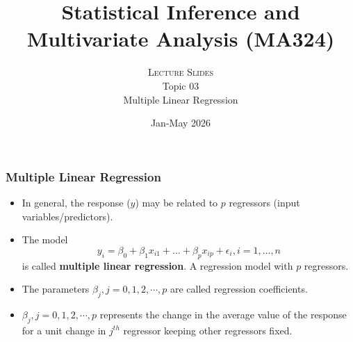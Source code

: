\documentclass[10pt]{beamer} %
\title[]{Statistical Inference and Multivariate Analysis (MA324)}
\subtitle{\textsc{Lecture Slides}\\Topic 03\\ Multiple Linear Regression}
\date{Jan-May 2026}
\begin{document}
\thispagestyle{empty}
\maketitle

\begin{frame}
   \frametitle{Multiple Linear Regression}
   \begin{itemize}
      \item In general, the response ($y$) may be related to $p$ regressors (input variables/predictors). 
         \vspace{0.25cm}
      \item The model 
         $$y_i = \beta_0 + \beta_1x_{i1} + \ldots + \beta_px_{ip} + \epsilon_i, i = 1,\ldots,n$$
         is called \textbf{multiple linear regression}. A regression model with $p$  regressors. 
         \vspace{0.25cm}
      \item The parameters $\beta_j, j= 0,1,2,\cdots,p$ are called regression coefficients. 
         \vspace{0.25cm}
      \item $\beta_j, j= 0,1,2,\cdots,p$ represents the change in the average
         value of the response for a unit change in $j^{th}$ regressor keeping
         other regressors fixed. 
         \vspace{0.25cm}
   \end{itemize}


\end{frame}
\end{document}
